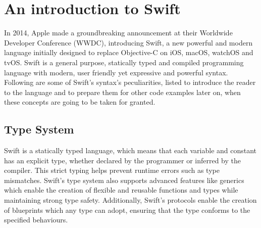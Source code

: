 \chapter{An introduction to Swift}
In 2014, Apple made a groundbreaking announcement at their Worldwide Developer Conference (WWDC), introducing Swift, a new powerful and modern language initially designed to replace Objective-C on iOS, macOS, watchOS and tvOS. 
Swift is a general purpose, statically typed and compiled programming language with modern, user friendly yet expressive and powerful syntax.
Following are some of Swift's syntax's peculiarities, listed to introduce the reader to the language and to prepare them for other code examples later on, when these concepts are going to be taken for granted.


\section{Type System}
Swift is a statically typed language, which means that each variable and constant has an explicit type, whether declared by the programmer or inferred by the compiler. This strict typing helps prevent runtime errors such as type mismatches. Swift's type system also supports advanced features like generics which enable the creation of flexible and reusable functions and types while maintaining strong type safety. Additionally, Swift's protocols enable the creation of blueprints which any type can adopt, ensuring that the type conforms to the specified behaviours.

